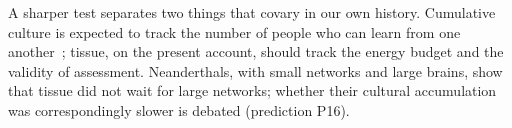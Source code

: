 A sharper test separates two things that covary in our own history. Cumulative culture is expected to track the number of
people who can learn from one another~\cite{powell2009,hill2014}; tissue, on the present account, should track the energy
budget and the validity of assessment. Neanderthals, with small networks and large brains, show that tissue did not wait for
large networks; whether their cultural accumulation was correspondingly slower is debated (prediction P16).
